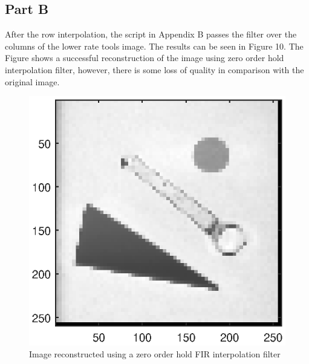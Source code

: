 \documentclass{article}
\begin{document}
\subsection{Part B}
After the row interpolation, the script in Appendix B passes the filter over the columns of the lower rate tools image. The results can be seen in Figure 10. The Figure shows a successful reconstruction of the image using zero order hold interpolation filter, however, there is some loss of quality in comparison with the original image.  
\begin{figure}[H]
	\begin{minipage}{0.5\linewidth}
		\centering
		\includegraphics[scale=0.8]{fig10}
		\caption{Image reconstructed using a zero order hold FIR interpolation filter}
	\end{minipage}
\hspace{0.5cm}
	\begin{minipage}{0.5\linewidth}
		\centering

\end{minipage}
\end{figure}
\end{document}
